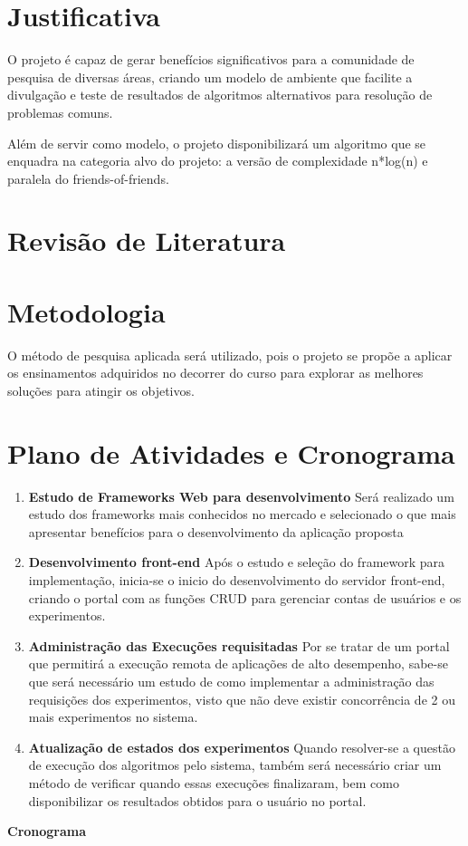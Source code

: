 \documentclass[12pt]{article}
\begin{document}
\section{Justificativa}
O projeto é capaz de gerar benefícios significativos para a comunidade de pesquisa de diversas áreas, criando um modelo de ambiente que facilite a divulgação e teste de resultados de algoritmos alternativos para resolução de problemas comuns.

Além de servir como modelo, o projeto disponibilizará um algoritmo que se enquadra na categoria alvo do projeto: a versão de complexidade n*log(n) e paralela do friends-of-friends.

\section{Revisão de Literatura}
\section{Metodologia}
O método de pesquisa aplicada será utilizado, pois o projeto se propõe a aplicar os ensinamentos adquiridos no decorrer do curso para explorar as melhores soluções para atingir os objetivos.

\section{Plano de Atividades e Cronograma}
\begin{enumerate}
\item \label{activity:frameworks} \textbf{Estudo de Frameworks Web para desenvolvimento}
Será realizado um estudo dos frameworks mais conhecidos no mercado e selecionado o que mais apresentar benefícios para o desenvolvimento da aplicação proposta
\item \label{activity:develop} \textbf{Desenvolvimento front-end}
Após o estudo e seleção do framework para implementação, inicia-se o inicio do desenvolvimento do servidor front-end, criando o portal com as funções CRUD para gerenciar contas de usuários e os experimentos.
\item \label{activity:exec} \textbf{Administração das Execuções requisitadas}
Por se tratar de um portal que permitirá a execução remota de aplicações de alto desempenho, sabe-se que será necessário um estudo de como implementar a administração das requisições dos experimentos, visto que não deve existir concorrência de 2 ou mais experimentos no sistema.
\item  \label{activity:updates} \textbf{Atualização de estados dos experimentos}
Quando resolver-se a questão de execução dos algoritmos pelo sistema, também será necessário criar um método de verificar quando essas execuções finalizaram, bem como disponibilizar os resultados obtidos para o usuário no portal.
\end{enumerate}
\textbf{Cronograma}
\end{document}
